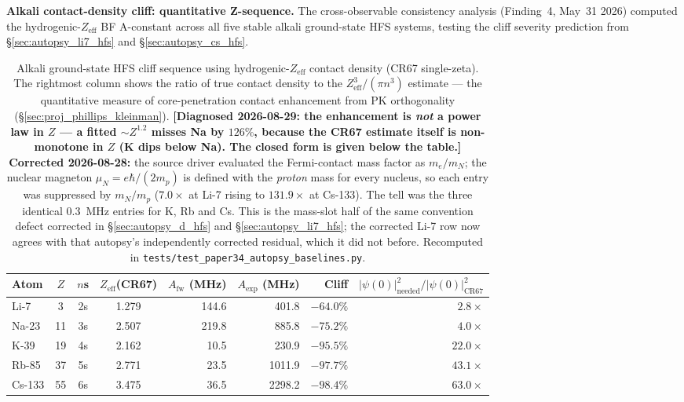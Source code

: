 \documentclass[11pt]{article}
\begin{document}
\textbf{Alkali contact-density cliff: quantitative Z-sequence.}
The cross-observable consistency analysis (Finding~4, May~31 2026)
computed the hydrogenic-$Z_\text{eff}$ BF A-constant across all five
stable alkali ground-state HFS systems, testing the cliff severity
prediction from \S\ref{sec:autopsy_li7_hfs} and
\S\ref{sec:autopsy_cs_hfs}.

\begin{table}[h]
\centering\small
\begin{tabular}{l c c c r r r r}
\toprule
Atom & $Z$ & $n$s & $Z_\text{eff}$(CR67) & $A_\text{fw}$ (MHz) &
$A_\text{exp}$ (MHz) & Cliff & $|\psi(0)|^2_\text{needed}/|\psi(0)|^2_\text{CR67}$ \\
\midrule
Li-7    &  3 & 2s & 1.279 & 144.6 &  401.8 & $-64.0\%$  & $2.8\times$ \\
Na-23   & 11 & 3s & 2.507 & 219.8 &  885.8 & $-75.2\%$  & $4.0\times$ \\
K-39    & 19 & 4s & 2.162 &  10.5 &  230.9 & $-95.5\%$  & $22.0\times$ \\
Rb-85   & 37 & 5s & 2.771 &  23.5 & 1011.9 & $-97.7\%$  & $43.1\times$ \\
Cs-133  & 55 & 6s & 3.475 &  36.5 & 2298.2 & $-98.4\%$  & $63.0\times$ \\
\bottomrule
\end{tabular}
\caption{Alkali ground-state HFS cliff sequence using
hydrogenic-$Z_\text{eff}$ contact density (CR67 single-zeta).
The rightmost column shows the ratio of true contact density to the
$Z_\text{eff}^3/(\pi n^3)$ estimate --- the quantitative measure of
core-penetration contact enhancement from PK orthogonality
(\S\ref{sec:proj_phillips_kleinman}).  \textbf{[Diagnosed
2026-08-29: the enhancement is \emph{not} a power law in $Z$ --- a
fitted $\sim Z^{1.2}$ misses Na by $126\%$, because the CR67 estimate
itself is non-monotone in $Z$ (K dips below Na).  The closed form is
given below the table.]}  \textbf{Corrected 2026-08-28:}
the source driver evaluated the Fermi-contact mass factor as $m_e/m_N$;
the nuclear magneton $\mu_N = e\hbar/(2m_p)$ is defined with the
\emph{proton} mass for every nucleus, so each entry was suppressed by
$m_N/m_p$ ($7.0\times$ at Li-7 rising to $131.9\times$ at Cs-133).  The
tell was the three identical $0.3$~MHz entries for K, Rb and Cs.  This is
the mass-slot half of the same convention defect corrected in
\S\ref{sec:autopsy_d_hfs} and \S\ref{sec:autopsy_li7_hfs}; the corrected
Li-7 row now agrees with that autopsy's independently corrected residual,
which it did not before. Recomputed in
\texttt{tests/test\_paper34\_autopsy\_baselines.py}.}
\label{tab:alkali_cliff_sequence}
\end{table}
\end{document}
